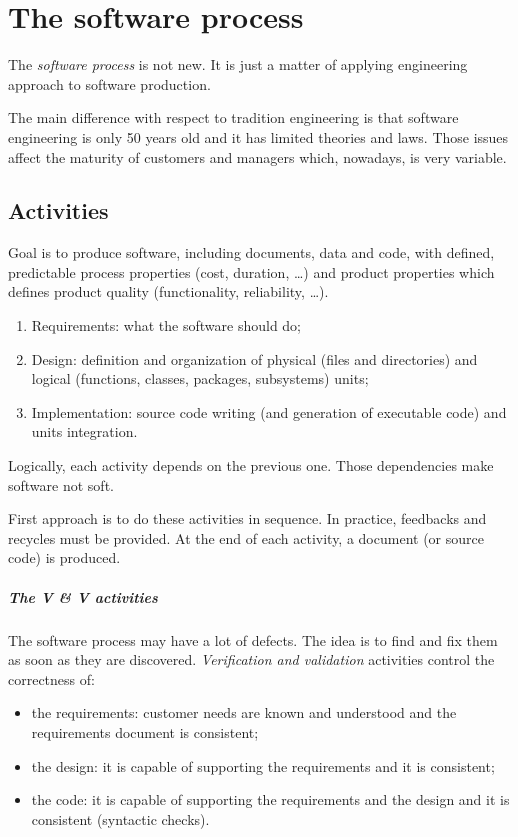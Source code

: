 \chapter{The software process}
The \emph{software process} is not new. It is just a matter of applying engineering approach to software production.

The main difference with respect to tradition engineering is that software engineering is only 50 years old and it has limited theories and laws. Those issues affect the maturity of customers and managers which, nowadays, is very variable.

\section{Activities}
Goal is to produce software, including documents, data and code, with defined, predictable process properties (cost, duration, \dots) and product properties which defines product quality (functionality, reliability, \dots).
\begin{enumerate}
\item Requirements: what the software should do;
\item Design: definition and organization of physical (files and directories) and logical (functions, classes, packages, subsystems) units;
\item Implementation: source code writing (and generation of executable code) and units integration.
\end{enumerate}
Logically, each activity depends on the previous one. Those dependencies make software not soft.

First approach is to do these activities in sequence. In practice, feedbacks and recycles must be provided. At the end of each activity, a document (or source code) is produced.

\paragraph{The V \& V activities}
The software process may have a lot of defects. The idea is to find and fix them as soon as they are discovered. \emph{Verification and validation} activities control the correctness of:
\begin{itemize}
\item the requirements: customer needs are known and understood and the requirements document is consistent;
\item the design: it is capable of supporting the requirements and it is consistent;
\item the code: it is capable of supporting the requirements and the design and it is consistent (syntactic checks).
\end{itemize}

